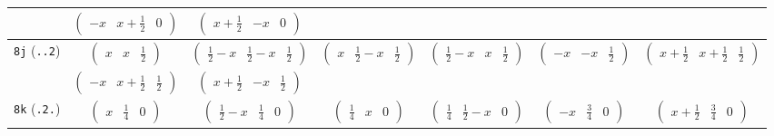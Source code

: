 \documentclass[fleqn,9pt,landscape]{jsarticle}
\begin{document}
\begin{center}
\begin{longtable}{ccccccc}
& $ \begin{pmatrix} - x & x + \frac{1}{2} & 0 \end{pmatrix} $ & $ \begin{pmatrix} x + \frac{1}{2} & - x & 0 \end{pmatrix} $ & $  $ & $  $ & $  $ & $  $ \\ \hline
{\tt 8j} ({\tt ..2}) & $ \begin{pmatrix} x & x & \frac{1}{2} \end{pmatrix} $ & $ \begin{pmatrix} \frac{1}{2} - x & \frac{1}{2} - x & \frac{1}{2} \end{pmatrix} $ & $ \begin{pmatrix} x & \frac{1}{2} - x & \frac{1}{2} \end{pmatrix} $ & $ \begin{pmatrix} \frac{1}{2} - x & x & \frac{1}{2} \end{pmatrix} $ & $ \begin{pmatrix} - x & - x & \frac{1}{2} \end{pmatrix} $ & $ \begin{pmatrix} x + \frac{1}{2} & x + \frac{1}{2} & \frac{1}{2} \end{pmatrix} $ \\
& $ \begin{pmatrix} - x & x + \frac{1}{2} & \frac{1}{2} \end{pmatrix} $ & $ \begin{pmatrix} x + \frac{1}{2} & - x & \frac{1}{2} \end{pmatrix} $ & $  $ & $  $ & $  $ & $  $ \\ \hline
{\tt 8k} ({\tt .2.}) & $ \begin{pmatrix} x & \frac{1}{4} & 0 \end{pmatrix} $ & $ \begin{pmatrix} \frac{1}{2} - x & \frac{1}{4} & 0 \end{pmatrix} $ & $ \begin{pmatrix} \frac{1}{4} & x & 0 \end{pmatrix} $ & $ \begin{pmatrix} \frac{1}{4} & \frac{1}{2} - x & 0 \end{pmatrix} $ & $ \begin{pmatrix} - x & \frac{3}{4} & 0 \end{pmatrix} $ & $ \begin{pmatrix} x + \frac{1}{2} & \frac{3}{4} & 0 \end{pmatrix} $ \\

\end{longtable}
\end{center}
\end{document}
